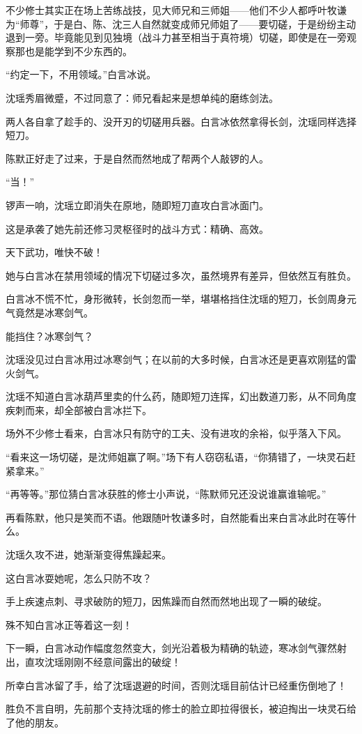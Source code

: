 不少修士其实正在场上苦练战技，见大师兄和三师姐——他们不少人都呼叶牧谦为“师尊”，于是白、陈、沈三人自然就变成师兄师姐了——要切磋，于是纷纷主动退到一旁。毕竟能见到见独境（战斗力甚至相当于真符境）切磋，即使是在一旁观察那也是能学到不少东西的。

“约定一下，不用领域。”白言冰说。

沈瑶秀眉微蹙，不过同意了：师兄看起来是想单纯的磨练剑法。

两人各自拿了趁手的、没开刃的切磋用兵器。白言冰依然拿得长剑，沈瑶同样选择短刀。

陈默正好走了过来，于是自然而然地成了帮两个人敲锣的人。

“当！”

锣声一响，沈瑶立即消失在原地，随即短刀直攻白言冰面门。

这是承袭了她先前还修习灵枢径时的战斗方式：精确、高效。

天下武功，唯快不破！

她与白言冰在禁用领域的情况下切磋过多次，虽然境界有差异，但依然互有胜负。

白言冰不慌不忙，身形微转，长剑忽而一举，堪堪格挡住沈瑶的短刀，长剑周身元气竟然是冰寒剑气。

能挡住？冰寒剑气？

沈瑶没见过白言冰用过冰寒剑气；在以前的大多时候，白言冰还是更喜欢刚猛的雷火剑气。

沈瑶不知道白言冰葫芦里卖的什么药，随即短刀连挥，幻出数道刀影，从不同角度疾刺而来，却全部被白言冰拦下。

场外不少修士看来，白言冰只有防守的工夫、没有进攻的余裕，似乎落入下风。

“看来这一场切磋，是沈师姐赢了啊。”场下有人窃窃私语，“你猜错了，一块灵石赶紧拿来。”

“再等等。”那位猜白言冰获胜的修士小声说，“陈默师兄还没说谁赢谁输呢。”

再看陈默，他只是笑而不语。他跟随叶牧谦多时，自然能看出来白言冰此时在等什么。

沈瑶久攻不进，她渐渐变得焦躁起来。

这白言冰耍她呢，怎么只防不攻？

手上疾速点刺、寻求破防的短刀，因焦躁而自然而然地出现了一瞬的破绽。

殊不知白言冰正等着这一刻！

下一瞬，白言冰动作幅度忽然变大，剑光沿着极为精确的轨迹，寒冰剑气骤然射出，直攻沈瑶刚刚不经意间露出的破绽！

所幸白言冰留了手，给了沈瑶退避的时间，否则沈瑶目前估计已经重伤倒地了！

胜负不言自明，先前那个支持沈瑶的修士的脸立即拉得很长，被迫掏出一块灵石给了他的朋友。

